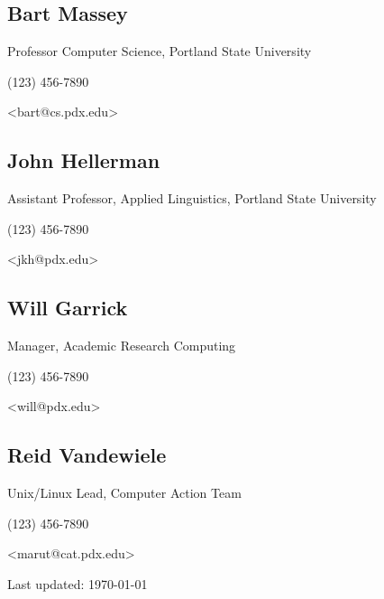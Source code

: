\documentclass[10pt,letterpaper]{article}
\renewenvironment{itemize}{
  \begin{list}{}{
    \setlength{\leftmargin}{1.5em}
    \setlength{\itemsep}{0em}
    \setlength{\parskip}{0pt}
    \setlength{\parsep}{0em}
  }
}{
  \end{list}
}
\begin{document}
\subsection*{Bart Massey}

\begin{itemize}
	
	\item Professor Computer Science, Portland State University
	\item (123) 456-7890
	\item <bart@cs.pdx.edu>	
	
\end{itemize}

\subsection*{John Hellerman}

\begin{itemize}
	
	\item Assistant Professor, Applied Linguistics, Portland State University
	\item (123) 456-7890
	\item <jkh@pdx.edu>
	
\end{itemize}

\subsection*{Will Garrick}

\begin{itemize}
	
	\item Manager, Academic Research Computing
	\item (123) 456-7890
	\item <will@pdx.edu>	
	
\end{itemize}

\subsection*{Reid Vandewiele}

\begin{itemize}
	
	\item Unix/Linux Lead, Computer Action Team
	\item (123) 456-7890
	\item <marut@cat.pdx.edu>	
	
\end{itemize}

\bigskip

\begin{center}
  \begin{small}
    Last updated: \today
  \end{small}
\end{center}
\end{document}
